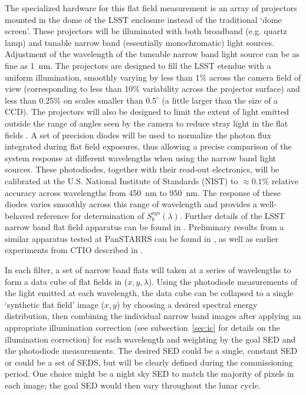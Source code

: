 \documentclass[12pt,preprint]{aastex}
\begin{document}
The specialized hardware for this flat field measurement is an array
of projectors mounted in the dome of the LSST enclosure instead of the
traditional `dome screen'. These projectors will be illuminated with
both broadband (e.g. quartz lamp) and tunable narrow band (essentially
monochromatic) light sources.  Adjustment of the wavelength of the
tuneable narrow band light source can be as fine as 1~nm. The
projectors are designed to fill the LSST etendue with a uniform
illumination, smoothly varying by less than 1\% across the camera
field of view (corresponding to less than 10\% variability across the
projector surface) and less than 0.25\% on scales smaller than
$0.5^{\circ}$ (a little larger than the size of a CCD).  The
projectors will also be designed to limit the extent of light emitted
outside the range of angles seen by the camera to reduce stray light
in the flat fields \citep{Gressler2010}. A set of precision diodes
will be used to normalize the photon flux integrated during flat field
exposures, thus allowing a precise comparison of the system response
at different wavelengths when using the narrow band light sources.
These photodiodes, together with their read-out electronics, will be
calibrated at the U.S. National Institute of Standards (NIST) to
$\approx0.1\%$ relative accuracy across wavelengths from 450~nm to
950~nm. The response of these diodes varies smoothly across this range
of wavelength and provides a well-behaved reference for determination
of $S_b^{sys}(\lambda)$.  Further details of the LSST narrow band flat
field apparatus can be found in \citet{Gressler2010}.  Preliminary
results from a similar apparatus tested at PanSTARRS can be found in
\citet{Stubbs2010}, as well as earlier experiments from CTIO described
in \citet{Stubbs2007a}.

In each filter, a set of narrow band flats will taken at a series of
wavelengths to form a data cube of flat fields in
($x,y,\lambda$). Using the photodiode measurements of the light
emitted at each wavelength, the data cube can be collapsed to a single
`synthetic flat field' image ($x,y$) by choosing a desired spectral
energy distribution, then combining the individual narrow band images
after applying an appropriate illumination correction (see
subsection~\ref{sec:ic} for details on the illumination correction) for each
wavelength and weighting by the goal SED and the photodiode
measurements. The desired SED could be a single, constant SED or could
be a set of SEDS, but will be clearly defined during the commissioning
period. One choice might be a night sky SED to match the majority of
pixels in each image; the goal SED would then vary throughout the
lunar cycle.
\end{document}
